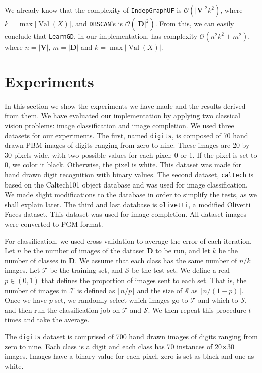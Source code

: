 \documentclass{amsart}
\DeclareMathOperator*{\Val}{\text{Val}}
\theoremstyle{plain}
\numberwithin{equation}{section}
\newcommand{\set}[1]{\mathbf{#1}}
\newcommand{\bigo}{\mathcal{O}}
\newcommand{\code}[1]{\lstinline[mathescape=true]{#1}}
\begin{document}
We already know that the complexity of \code{IndepGraphUF} is $\bigo(|\set{V}|^2 k^2)$, where
$k=\max |\Val(X)|$, and \code{DBSCAN}'s is $\bigo(|\set{D}|^2)$. From this, we can easily conclude
that \code{LearnGD}, in our implementation, has complexity $\bigo(n^2 k^2 + m^2)$, where
$n=|\set{V}|$, $m=|\set{D}|$ and $k=\max |\Val(X)|$.

\section{Experiments}

In this section we show the experiments we have made and the results derived from them. We have
evaluated our implementation by applying two classical vision problems: image classification and
image completion. We used three datasets for our experiments. The first, named \code{digits}, is
composed of 70 hand drawn PBM images of digits ranging from zero to nine. These images are 20 by 30
pixels wide, with two possible values for each pixel: 0 or 1. If the pixel is set to 0, we color it
black. Otherwise, the pixel is white. This dataset was made for hand drawn digit recognition with
binary values. The second dataset, \code{caltech} is based on the Caltech101 object database
\cite{caltech101} and was used for image classification. We made slight modifications to the
database in order to simplify the tests, as we shall explain later. The third and last database is
\code{olivetti}, a modified Olivetti Faces dataset. This dataset was used for image completion. All
dataset images were converted to PGM format.

For classification, we used cross-validation to average the error of each iteration. Let $n$ be the
number of images of the dataset $\set{D}$ to be run, and let $k$ be the number of classes in
$\set{D}$. We assume that each class has the same number of $n/k$ images. Let $\mathcal{T}$ be the
training set, and $\mathcal{S}$ be the test set. We define a real $p\in (0, 1)$ that defines the
proportion of images sent to each set. That is, the number of images in $\mathcal{T}$ is defined as
$\lfloor n/p \rfloor$ and the size of $\mathcal{S}$ as $\lceil n/(1-p) \rceil$. Once we have $p$
set, we randomly select which images go to $\mathcal{T}$ and which to $\mathcal{S}$, and then run
the classification job on $\mathcal{T}$ and $\mathcal{S}$. We then repeat this procedure $t$ times
and take the average.

The \code{digits} dataset is comprised of 700 hand drawn images of digits ranging from zero to
nine. Each class is a digit and each class has 70 instances of 20$\times$30 images. Images have a
binary value for each pixel, zero is set as black and one as white.
\end{document}
